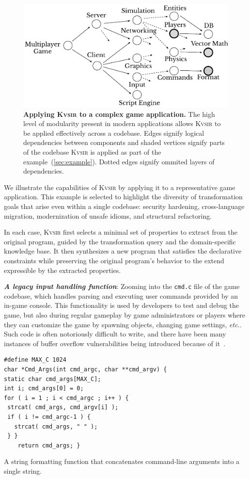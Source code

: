 \documentclass[sigplan,review,anonymous,10pt]{acmart}
\def\etc{{\em etc.}\xspace}
\newcommand{\sys}{{\scshape Kv{\textalpha}sir}\xspace}
\newcommand{\heading}[1]{\vspace{2pt}\noindent\textbf{\emph{#1}}:\enspace}
\newcommand{\ttt}[1]{\texttt{#1}\xspace}
\begin{document}
\begin{figure}[t]
\centering
  \includegraphics[width=.9\columnwidth]{figs/kvasir_application.pdf}
  \caption{\textbf{Applying \sys to a complex game application.}
  The high level of modularity present in modern applications allows \sys to be applied effectively across a codebase.
  Edges signify logical dependencies between components 
  and shaded vertices signify parts of the codebase \sys is applied as part of the example~(\cref{sec:example}).
  Dotted edges signify ommited layers of dependencies.
  }
  \label{fig:ex-large-app}
\end{figure}

We illustrate the capabilities of \sys by applying it to a representative game
application.
This example is selected to highlight the
diversity of transformation goals that arise even within a single codebase:
security hardening, cross-language migration, modernization of unsafe idioms,
and structural refactoring.

In each case, \sys first selects a minimal set of properties to extract from
the original program, guided by the transformation query and the
domain-specific knowledge base.
It then synthesizes a new program that
satisfies the declarative constraints while preserving the original
program's behavior to the extend expressible by the extracted properties.

\heading{A legacy input handling function}
Zooming into the \ttt{cmd.c} file of the game codebase, 
which handles parsing and executing user commands provided by an in-game console.
This functionality is used by developers to test and debug the game, but also during regular gameplay
by game administrators or players where they can customize the game by spawning objects, changing game settings, \etc.
Such code is often notoriously difficult to write,
and there have been many instances of buffer overflow vulnerabilities being introduced because of it~\cite{CVE-2006-3400, CVE-2006-3401, CVE-2007-5248, CVE-2019-1010043}.
\begin{listing}
\begin{verbatim}
#define MAX_C 1024
char *Cmd_Args(int cmd_argc, char **cmd_argv) {
static char cmd_args[MAX_C];
int i; cmd_args[0] = 0;
for ( i = 1 ; i < cmd_argc ; i++ ) {
 strcat( cmd_args, cmd_argv[i] );
 if ( i != cmd_argc-1 ) {
   strcat( cmd_args, " " );
 } }
	return cmd_args; }
\end{verbatim}
\caption{A string formatting function that concatenates command-line arguments into a single string.}
\end{listing}
\end{document}
